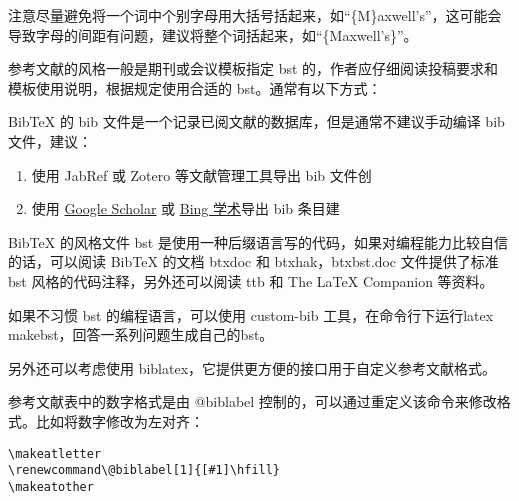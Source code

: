注意尽量避免将一个词中个别字母用大括号括起来，如``\{M\}axwell's''，这可能会导致字母的间距有问题，建议将整个词括起来，如``\{Maxwell's\}''。



参考文献的风格一般是期刊或会议模板指定 bst
的，作者应仔细阅读投稿要求和模板使用说明，根据规定使用合适的
bst。通常有以下方式：




BibTeX 的 bib 文件是一个记录已阅文献的数据库，但是通常不建议手动编译 bib
文件，建议：

\begin{enumerate}
\def\labelenumi{\arabic{enumi}.}

\item
  使用 JabRef 或 Zotero 等文献管理工具导出 bib 文件创
\item
  使用 \href{https://scholar.google.com/}{Google Scholar} 或
  \href{https://cn.bing.com/academic}{Bing 学术}导出 bib 条目建
\end{enumerate}



BibTeX 的风格文件 bst
是使用一种后缀语言写的代码，如果对编程能力比较自信的话，可以阅读 BibTeX
的文档 btxdoc 和 btxhak，btxbst.doc 文件提供了标准 bst
风格的代码注释，另外还可以阅读 ttb 和 The LaTeX Companion 等资料。

如果不习惯 bst 的编程语言，可以使用 custom-bib 工具，在命令行下运行latex
makebst，回答一系列问题生成自己的bst。

另外还可以考虑使用 biblatex，它提供更方便的接口用于自定义参考文献格式。



参考文献表中的数字格式是由 @biblabel
控制的，可以通过重定义该命令来修改格式。比如将数字修改为左对齐：

\begin{verbatim}
\makeatletter
\renewcommand\@biblabel[1]{[#1]\hfill}
\makeatother
\end{verbatim}



